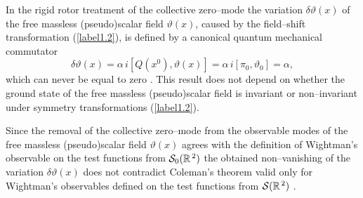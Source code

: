 \documentclass[a4paper,12pt] {article}
\begin{document}
In the rigid rotor treatment of the collective zero--mode the
variation $\delta \vartheta(x)$ of the free massless (pseudo)scalar
field $\vartheta(x)$, caused by the field--shift transformation
(\ref{label1.2}), is defined by a canonical quantum mechanical
commutator
$$
\delta \vartheta(x) = \alpha\,i[Q(x^0),\vartheta(x)] =
\alpha\,i[\pi_0,\vartheta_0] = \alpha,
$$
which can never be equal to zero \cite{Co73}. This result does not
depend on whether the ground state of the free massless (pseudo)scalar
field is invariant or non--invariant under symmetry transformations
(\ref{label1.2}).

Since the removal of the collective zero--mode from the observable
modes of the free massless (pseudo)scalar field $\vartheta(x)$ agrees
with the definition of Wightman's observable on the test functions
from ${\cal S}_0(\mathbb{R}^{\,2})$ the obtained non--vanishing of the
variation $\delta \vartheta(x)$ does not contradict Coleman's theorem
valid only for Wightman's observables defined on the test functions
from ${\cal S}(\mathbb{R}^{\,2})$ \cite{th0204237,th0206244}.




















\newpage
\end{document}
